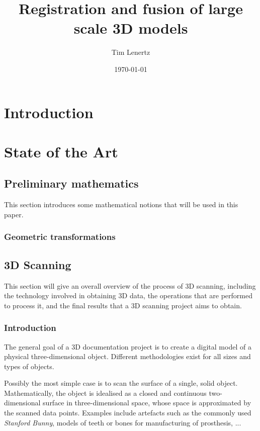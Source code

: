 \documentclass[a4paper,10pt]{scrreprt}
\begin{document}
\title{Registration and fusion of large scale 3D models}
\author{Tim Lenertz}
\date{\today}
\maketitle

\tableofcontents

\chapter{Introduction}

\chapter{State of the Art}
\section{Preliminary mathematics}
This section introduces some mathematical notions that will be used in this paper.

\subsection{Geometric transformations}

\section{3D Scanning}
This section will give an overall overview of the process of 3D scanning, including the technology involved in obtaining 3D data, the operations that are performed to process it, and the final results that a 3D scanning project aims to obtain.

\subsection{Introduction}
The general goal of a 3D documentation project is to create a digital model of a physical three-dimensional object. Different methodologies exist for all sizes and types of objects.

Possibly the most simple case is to scan the surface of a single, solid object. Mathematically, the object is idealised as a closed and continuous two-dimensional surface in three-dimensional space, whose space is approximated by the scanned data points. Examples include artefacts such as the commonly used \emph{Stanford Bunny}, models of teeth or bones for manufacturing of prosthesis, ...
\end{document}
